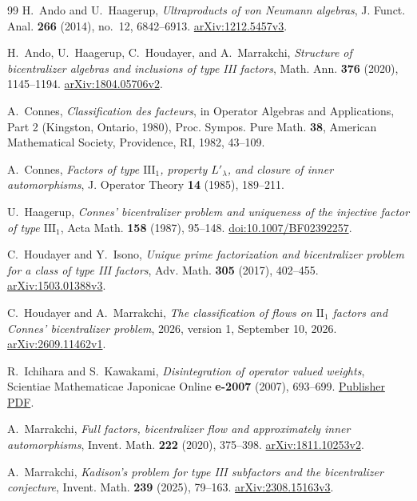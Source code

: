 \documentclass[11pt]{article}
\theoremstyle{definition}
\begin{document}
\begin{thebibliography}{99}
H.~Ando and U.~Haagerup, \emph{Ultraproducts of von Neumann algebras},
J. Funct. Anal. \textbf{266} (2014), no.~12, 6842--6913.
\href{https://arxiv.org/abs/1212.5457v3}{arXiv:1212.5457v3}.

H.~Ando, U.~Haagerup, C.~Houdayer, and A.~Marrakchi,
\emph{Structure of bicentralizer algebras and inclusions of type III factors},
Math. Ann. \textbf{376} (2020), 1145--1194.
\href{https://arxiv.org/abs/1804.05706v2}{arXiv:1804.05706v2}.

A.~Connes, \emph{Classification des facteurs}, in Operator Algebras and
Applications, Part 2 (Kingston, Ontario, 1980), Proc. Sympos. Pure Math.
\textbf{38}, American Mathematical Society, Providence, RI, 1982, 43--109.

A.~Connes, \emph{Factors of type $\mathrm{III}_1$, property $L'_\lambda$,
and closure of inner automorphisms}, J. Operator Theory \textbf{14}
(1985), 189--211.

U.~Haagerup, \emph{Connes' bicentralizer problem and uniqueness of the
injective factor of type $\mathrm{III}_1$}, Acta Math. \textbf{158} (1987),
95--148. \href{https://doi.org/10.1007/BF02392257}{doi:10.1007/BF02392257}.

C.~Houdayer and Y.~Isono, \emph{Unique prime factorization and bicentralizer
problem for a class of type III factors}, Adv. Math. \textbf{305}
(2017), 402--455.
\href{https://arxiv.org/abs/1503.01388v3}{arXiv:1503.01388v3}.

C.~Houdayer and A.~Marrakchi, \emph{The classification of flows on
$\mathrm{II}_1$ factors and Connes' bicentralizer problem}, 2026,
version 1, September 10, 2026.
\href{https://arxiv.org/abs/2609.11462v1}{arXiv:2609.11462v1}.

R.~Ichihara and S.~Kawakami, \emph{Disintegration of operator valued
weights}, Scientiae Mathematicae Japonicae Online \textbf{e-2007}
(2007), 693--699.
\href{https://www.jams.jp/scm/contents/e-2007-7/2007-63.pdf}{Publisher PDF}.

A.~Marrakchi, \emph{Full factors, bicentralizer flow and approximately inner
automorphisms}, Invent. Math. \textbf{222} (2020), 375--398.
\href{https://arxiv.org/abs/1811.10253v2}{arXiv:1811.10253v2}.

A.~Marrakchi, \emph{Kadison's problem for type III subfactors and the
bicentralizer conjecture}, Invent. Math. \textbf{239} (2025), 79--163.
\href{https://arxiv.org/abs/2308.15163v3}{arXiv:2308.15163v3}.


\end{thebibliography}
\end{document}
